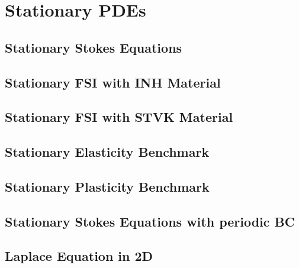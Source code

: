 \documentclass[a4paper,cleardoubleempty]{scrreprt}
\begin{document}
\section{Stationary PDEs} 
\label{PDE_Stat}
\subsection{Stationary Stokes Equations} 
\label{PDE_Stat_Stokes}

\clearpage
\subsection{Stationary FSI with INH Material} 
\label{PDE_Stat_FSI_INH}

\clearpage
\subsection{Stationary FSI with STVK Material} 
\label{PDE_Stat_FSI_STVK}

\clearpage
\subsection{Stationary Elasticity Benchmark} 
\label{PDE_Stat_Elasticity}

\clearpage
\subsection{Stationary Plasticity Benchmark} 
\label{PDE_Stat_Plasticity}

\clearpage
\subsection{Stationary Stokes Equations with periodic BC} 
\label{PDE_Stat_Periodic_Stokes}

\clearpage
\subsection{Laplace Equation in 2D} 
\label{PDE_Stat_Laplace_2D}

\clearpage
\end{document}
